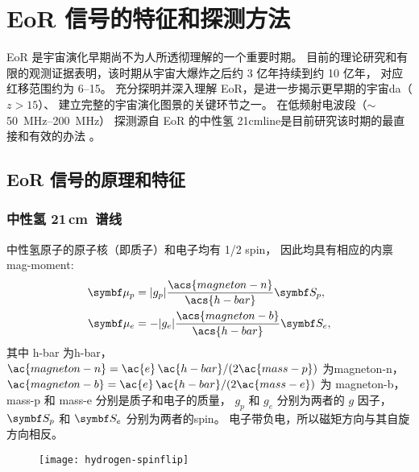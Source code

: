 

\chapter{EoR 信号的特征和探测方法}
\label{chap:detection}

EoR 是宇宙演化早期尚不为人所透彻理解的一个重要时期。
目前的理论研究和有限的观测证据表明，该时期从宇宙大爆炸之后约 3 亿年持续到约 10 亿年，
对应红移范围约为 \numrange{6}{15}。
充分探明并深入理解 EoR，是进一步揭示更早期的宇宙\ac{da}（$z > 15$）、
建立完整的宇宙演化图景的关键环节之一。
在低频射电波段（$\sim$\,\SIrange{50}{200}{\MHz}）
探测源自 EoR 的中性氢 \ac{21cmline}是目前研究该时期的最直接和有效的办法
\cite{madau1997,tozzi2000,furlanetto2006}。


\section{EoR 信号的原理和特征}
\label{sec:eor-signal}

\subsection{中性氢 21\texorpdfstring{\,}{ }cm~谱线}
\label{sec:21cm-line}

中性氢原子的原子核（即质子）和电子均有 1/2 \ac{spin}，
因此均具有相应的内禀\ac{mag-moment}:
\begin{align}
  \B{\mu}_p & = |g_p| \frac{\acs{magneton-n}}{\acs{h-bar}} \B{S}_p , \\
  \B{\mu}_e & = - |g_e| \frac{\acs{magneton-b}}{\acs{h-bar}} \B{S}_e ,
\end{align}
其中
\ac{h-bar} 为\acl{h-bar}，
$\ac{magneton-n} = \ac{e}\,\ac{h-bar} / (2 \ac{mass-p})$ 为\acl{magneton-n}，
$\ac{magneton-b} = \ac{e}\,\ac{h-bar} / (2 \ac{mass-e})$ 为 \acl{magneton-b}，
\ac{mass-p} 和 \ac{mass-e} 分别是质子和电子的质量，
$g_p$ 和 $g_e$ 分别为两者的 $g$ 因子，
$\B{S}_p$ 和 $\B{S}_e$ 分别为两者的\ac{spin}。
电子带负电，所以磁矩方向与其自旋方向相反。

\begin{figure}[htp]
  \centering
  \texttt{[image: hydrogen-spinflip]}
  \label{fig:hi-spinflip}
\end{figure}

